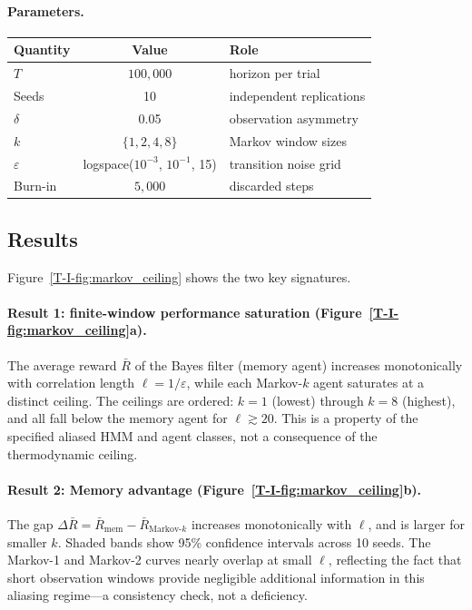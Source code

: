 \documentclass[12pt,a4paper,openany]{book}
\begin{document}
\paragraph{Parameters.}
\begin{center}
\small
\begin{tabular}{@{}lcl@{}}
\toprule
\textbf{Quantity} & \textbf{Value} & \textbf{Role} \\
\midrule
$T$ & $100{,}000$ & horizon per trial \\
Seeds & 10 & independent replications \\
$\delta$ & 0.05 & observation asymmetry \\
$k$ & $\{1, 2, 4, 8\}$ & Markov window sizes \\
$\varepsilon$ & logspace($10^{-3}$, $10^{-1}$, 15)
  & transition noise grid \\
Burn-in & $5{,}000$ & discarded steps \\
\bottomrule
\end{tabular}
\end{center}

\subsection{Results}
\label{T-I-subsec:demo_results}

Figure~\ref{T-I-fig:markov_ceiling} shows the two key signatures.

\paragraph{Result 1: finite-window performance saturation
(Figure~\ref{T-I-fig:markov_ceiling}a).}
The average reward $\bar{R}$ of the Bayes filter (memory
agent) increases monotonically with correlation length
$\ell = 1/\varepsilon$, while each Markov-$k$ agent
saturates at a distinct ceiling.  The ceilings are
ordered: $k = 1$ (lowest) through $k = 8$ (highest),
and all fall below the memory agent for
$\ell \gtrsim 20$.  This is a property of the specified
aliased HMM and agent classes, not a consequence of the
thermodynamic ceiling.

\paragraph{Result 2: Memory advantage
(Figure~\ref{T-I-fig:markov_ceiling}b).}
The gap $\Delta\bar{R} = \bar{R}_{\mathrm{mem}}
- \bar{R}_{\mathrm{Markov}\text{-}k}$ increases
monotonically with $\ell$, and is larger for smaller $k$.
Shaded bands show 95\% confidence intervals across
10 seeds.  The Markov-1 and Markov-2 curves nearly
overlap at small $\ell$, reflecting the fact that
short observation windows provide negligible additional
information in this aliasing regime---a consistency
check, not a deficiency.
\end{document}
